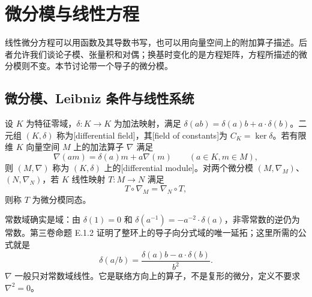 %
%
\section{微分模与线性方程}
\label{b5:sec:E01}

线性微分方程可以用函数及其导数书写，也可以用向量空间上的附加算子描述。后者允许我们谈论子模、张量积和对偶；换基时变化的是方程矩阵，方程所描述的微分模则不变。本节讨论带一个导子的微分模。

\subsection{微分模、Leibniz 条件与线性系统}
\label{b5:subsec:E01:01}

\begin{definition}\label{b5:def:E-differential-module}
	设 \(K\) 为特征零域，\(\delta:K\to K\) 为加法映射，满足 \(\delta(ab)=\delta(a)b+a\cdot\delta(b)\)。二元组 \((K,\delta)\) 称为[differential field]，其[field of constants]为 \(C_K=\ker\delta\)。若有限维 \(K\) 向量空间 \(M\) 上的加法算子 \(\nabla\) 满足
	\[
		\nabla(am)=\delta(a)m+a\nabla(m)\qquad(a\in K,m\in M),
	\]
	则 \((M,\nabla)\) 称为 \((K,\delta)\) 上的[differential module]。对两个微分模 \((M,\nabla_M)\)、\((N,\nabla_N)\)，若 \(K\) 线性映射 \(T:M\to N\) 满足
	\[
		T\circ\nabla_M=\nabla_N\circ T,
	\]
	则称 \(T\) 为微分模同态。
\end{definition}

常数域确实是域：由 \(\delta(1)=0\) 和 \(\delta(a^{-1})=-a^{-2}\cdot\delta(a)\)，非零常数的逆仍为常数。第三卷命题 E.1.2 证明了整环上的导子向分式域的唯一延拓；这里所需的公式就是
\[
	\delta(a/b)=\frac{\delta(a)b-a\cdot\delta(b)}{b^2}.
\]
\(\nabla\) 一般只对常数域线性。它是联络方向上的算子，不是复形的微分，定义不要求 \(\nabla^2=0\)。

